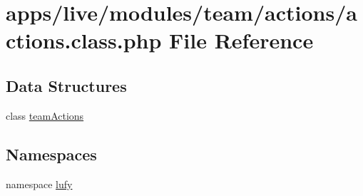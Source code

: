 \hypertarget{live_2modules_2team_2actions_2actions_8class_8php}{\section{apps/live/modules/team/actions/actions.class.\-php File Reference}
\label{live_2modules_2team_2actions_2actions_8class_8php}
}
\subsection*{Data Structures}
\begin{DoxyCompactItemize}
\item 
class \hyperlink{classteam_actions}{team\-Actions}
\end{DoxyCompactItemize}
\subsection*{Namespaces}
\begin{DoxyCompactItemize}
\item 
namespace \hyperlink{namespacelufy}{lufy}
\end{DoxyCompactItemize}
